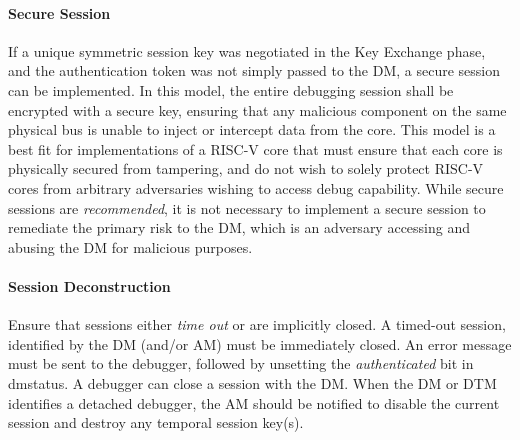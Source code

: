 \paragraph{Secure Session}
If a unique symmetric session key was negotiated in the Key Exchange phase, and the authentication token was not simply passed to the DM, a secure session can be implemented. In this model, the entire debugging session shall be encrypted with a secure key, ensuring that any malicious component on the same physical bus is unable to inject or intercept data from the core. This model is a best fit for implementations of a RISC-V core that must ensure that each core is physically secured from tampering, and do not wish to solely protect RISC-V cores from arbitrary adversaries wishing to access debug capability. While secure sessions are {\em recommended}, it is not necessary to implement a secure session to remediate the primary risk to the DM, which is an adversary accessing and abusing the DM for malicious purposes. 

\paragraph{Session Deconstruction}
Ensure that sessions either {\em time out} or are implicitly closed. A timed-out session, identified by the DM (and/or AM) must be immediately closed. An error message must be sent to the debugger, followed by unsetting the {\em authenticated} bit in dmstatus. A debugger can close a session with the DM. When the DM or DTM identifies a detached debugger, the AM should be notified to disable the current session and destroy any temporal session key(s). 

